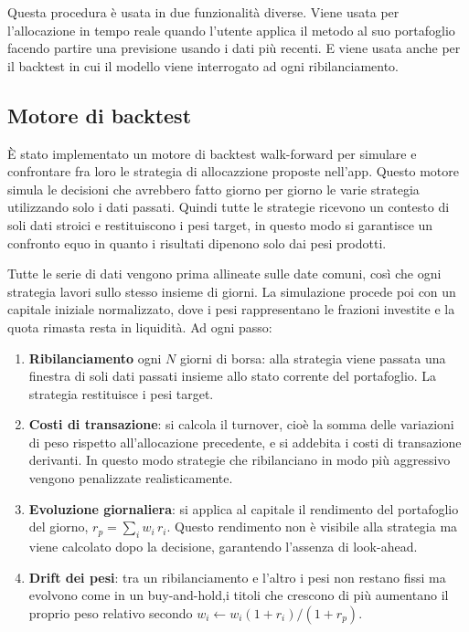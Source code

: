 Questa procedura è usata in due funzionalità diverse.
Viene usata per l'allocazione in tempo reale quando l'utente applica il metodo al suo portafoglio facendo partire una previsione usando i dati più recenti.
E viene usata anche per il backtest in cui il modello viene interrogato ad ogni ribilanciamento.

\subsection{Motore di backtest}
È stato implementato un motore di backtest walk-forward per simulare e confrontare fra loro le strategia di allocazzione proposte nell'app.
Questo motore simula le decisioni che avrebbero fatto giorno per giorno le varie strategia utilizzando solo i dati passati.
Quindi tutte le strategie ricevono un contesto di soli dati stroici e restituiscono i pesi target, in questo modo si garantisce un confronto equo in quanto i risultati dipenono solo dai pesi prodotti.

Tutte le serie di dati vengono prima allineate sulle date comuni, così che ogni
strategia lavori sullo stesso insieme di giorni. 
La simulazione procede poi con un capitale iniziale normalizzato, dove i pesi rappresentano le frazioni investite
e la quota rimasta resta in liquidità. Ad ogni passo:

\begin{enumerate}
  \item \textbf{Ribilanciamento} ogni $N$ giorni di borsa: alla strategia viene passata una finestra di soli dati
  passati insieme allo stato corrente del portafoglio.
  La strategia restituisce i pesi target.
  \item \textbf{Costi di transazione}: si calcola il turnover, cioè la
  somma delle variazioni di peso rispetto all'allocazione precedente, e si
  addebita i costi di transazione derivanti. In questo
  modo strategie che ribilanciano in modo più aggressivo vengono penalizzate
  realisticamente.
  \item \textbf{Evoluzione giornaliera}: si applica al capitale il rendimento del
  portafoglio del giorno, $r_p = \sum_i w_i \, r_{i}$. Questo rendimento
  non è visibile alla strategia ma viene calcolato dopo la decisione,
  garantendo l'assenza di look-ahead.
  \item \textbf{Drift dei pesi}: tra un ribilanciamento e l'altro i pesi non
  restano fissi ma evolvono come in un buy-and-hold,i titoli che
  crescono di più aumentano il proprio peso relativo secondo
  $w_i \leftarrow w_i (1 + r_i) / (1 + r_p)$.
\end{enumerate}

